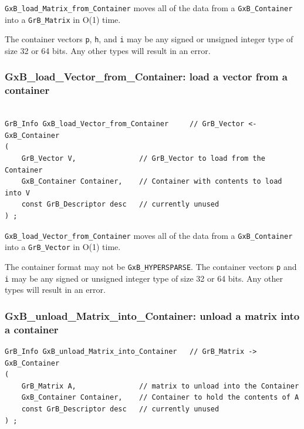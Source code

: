 \verb'GxB_load_Matrix_from_Container' moves all of the data from a
\verb'GxB_Container' into a \verb'GrB_Matrix' in O(1) time.

The container vectors \verb'p', \verb'h', and \verb'i' may be any signed or
unsigned integer type of size 32 or 64 bits.  Any other types will result in
an error.

\subsubsection{{\sf GxB\_load\_Vector\_from\_Container:} load a vector from a container}
\label{load_vector_from_container}

\begin{mdframed}[userdefinedwidth=6in]
{\footnotesize
\begin{verbatim}

GrB_Info GxB_load_Vector_from_Container     // GrB_Vector <- GxB_Container
(
    GrB_Vector V,               // GrB_Vector to load from the Container
    GxB_Container Container,    // Container with contents to load into V
    const GrB_Descriptor desc   // currently unused
) ;
\end{verbatim}
} \end{mdframed}

\verb'GxB_load_Vector_from_Container' moves all of the data from a
\verb'GxB_Container' into a \verb'GrB_Vector' in O(1) time.

The container format may not be \verb'GxB_HYPERSPARSE'.
The container vectors \verb'p' and \verb'i' may be any signed or
unsigned integer type of size 32 or 64 bits.  Any other types will result in
an error.

\subsubsection{{\sf GxB\_unload\_Matrix\_into\_Container:} unload a matrix into a container}
\label{unload_matrix_into_container}

\begin{mdframed}[userdefinedwidth=6in]
{\footnotesize
\begin{verbatim}
GrB_Info GxB_unload_Matrix_into_Container   // GrB_Matrix -> GxB_Container
(
    GrB_Matrix A,               // matrix to unload into the Container
    GxB_Container Container,    // Container to hold the contents of A
    const GrB_Descriptor desc   // currently unused
) ;
\end{verbatim}
} \end{mdframed}

